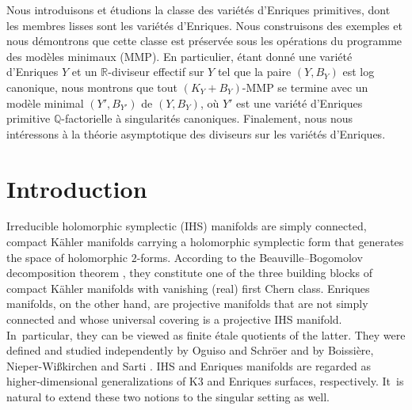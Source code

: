 \documentclass[JEP,XML,SOM,Unicode,published]{cedram}
\theoremstyle{plain}
\theoremstyle{definition}
\begin{document}




\begin{altabstract}
Nous introduisons et étudions la classe des variétés d’Enriques primitives, dont les membres lisses sont les variétés d’Enriques. Nous construisons des exemples et nous démontrons que cette classe est préservée sous les opérations du programme des modèles minimaux (MMP). En particulier, étant donné une variété d’Enriques $Y$ et un $\mathbb{R}$-diviseur effectif sur $Y$ tel que la paire $(Y,B_Y)$ est log canonique, nous montrons que tout $(K_Y+B_Y)$-MMP se termine avec un modèle minimal $(Y',B_{Y'})$ de $(Y,B_Y)$, où $Y'$ est une variété d’Enriques primitive $\mathbb{Q}$\nobreakdash-factorielle à singularités canoniques. Finalement, nous nous intéressons à la théorie asymptotique des diviseurs sur les variétés d’Enriques.
\end{altabstract}

\maketitle

\tableofcontents
\mainmatter

\section{Introduction}

Irreducible holomorphic symplectic (IHS) manifolds are simply connected, compact Kähler manifolds carrying a holomorphic symplectic form that generates the space of holomorphic $2$-forms. According to the Beauville--Bogomolov decomposition theorem \cite{Beauville83a}, they constitute one of the three building blocks of compact Kähler manifolds with vanishing (real) first Chern class.
Enriques manifolds, on the other hand, are projective manifolds that are not simply connected and whose universal covering is a projective IHS manifold. In~particular, they can be viewed as finite étale quotients of the latter. They were defined and studied independently by Oguiso and Schröer \cite{OS11a,OS11b} and by Boissière, Nieper-Wi{\ss}kirchen and Sarti \cite{BNWS11}.
IHS and Enriques manifolds are regarded as higher-dimensional generalizations of K3 and Enriques surfaces, respectively. It~is natural to extend these two notions to the singular setting as well.
\end{document}

